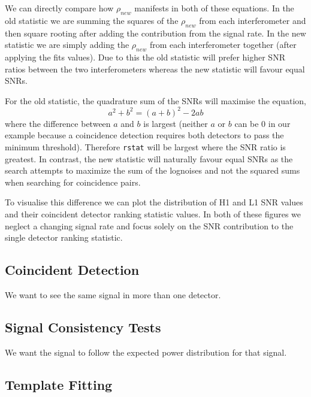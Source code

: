 We can directly compare how $\rho_{new}$ manifests in both of these equations. In the old statistic we are summing the squares of the $\rho_{new}$ from each interferometer and then square rooting after adding the contribution from the signal rate. In the new statistic we are simply adding the $\rho_{new}$ from each interferometer together (after applying the fits values). Due to this the old statistic will prefer higher SNR ratios between the two interferometers whereas the new statistic will favour equal SNRs.

For the old statistic, the quadrature sum of the SNRs will maximise the equation,
%
\begin{equation}
    a^{2} + b^{2} = (a + b)^{2} - 2ab
\end{equation}
%
where the difference between $a$ and $b$ is largest (neither $a$ or $b$ can be $0$ in our example because a coincidence detection requires both detectors to pass the minimum threshold). Therefore \verb|rstat| will be largest where the SNR ratio is greatest. In contrast, the new statistic will naturally favour equal SNRs as the search attempts to maximize the sum of the lognoises and not the squared sums when searching for coincidence pairs.

To visualise this difference we can plot the distribution of H1 and L1 SNR values and their coincident detector ranking statistic values. In both of these figures we neglect a changing signal rate and focus solely on the SNR contribution to the single detector ranking statistic.
%

\subsection{\label{sec:coincident-detection}Coincident Detection}

We want to see the same signal in more than one detector.

\subsection{\label{sec:signal-consistency-tests}Signal Consistency Tests}

We want the signal to follow the expected power distribution for that signal.

\subsection{\label{sec:template-fitting}Template Fitting}

